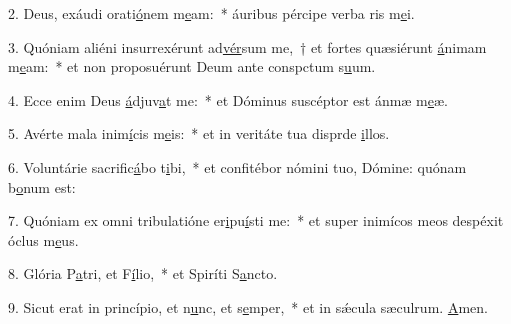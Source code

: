 2. Deus, exáudi orati\uline{ó}nem m\uline{e}am:~* áuribus pércipe verba ris m\uline{e}i.\par 
3. Quóniam aliéni insurrexérunt ad\uline{vér}sum me,~† et fortes quæsiérunt \uline{á}nimam m\uline{e}am:~* et non proposuérunt Deum ante conspctum s\uline{u}um.\par 
4. Ecce enim Deus \uline{á}djuv\uline{a}t me:~* et Dóminus suscéptor est ánmæ m\uline{e}æ.\par 
5. Avérte mala inim\uline{í}cis m\uline{e}is:~* et in veritáte tua disprde \uline{i}llos.\par 
6. Voluntárie sacrific\uline{á}bo t\uline{i}bi,~* et confitébor nómini tuo, Dómine: quónam b\uline{o}num est:\par 
7. Quóniam ex omni tribulatióne er\uline{i}pu\uline{í}sti me:~* et super inimícos meos despéxit óclus m\uline{e}us.\par 
8. Glória P\uline{a}tri, et F\uline{í}lio,~* et Spiríti S\uline{a}ncto.\par 
9. Sicut erat in princípio, et n\uline{u}nc, et s\uline{e}mper,~* et in sǽcula sæculrum. \uline{A}men.\par 
